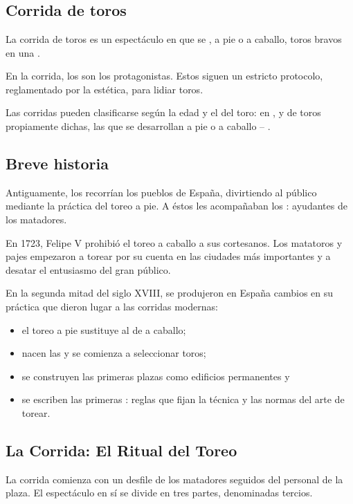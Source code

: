 \chapter*{\docTitle}\label{sec:report}


\section*{Corrida de toros}
%
La corrida de toros es un espectáculo en que se , a pie o a caballo, toros bravos en una .

En la corrida, los  son los protagonistas. Estos siguen un estricto protocolo, reglamentado por la estética, para lidiar toros. 

Las corridas pueden clasificarse según la edad y el  del toro: en ,  y  de toros propiamente dichas, las que se desarrollan a pie o a caballo -- .


\section*{Breve historia}
%
Antiguamente, los  recorrían los pueblos de España, divirtiendo al público mediante la práctica del toreo a pie. A éstos les acompañaban los : ayudantes de los matadores. 

En 1723, Felipe V prohibió el toreo a caballo a sus cortesanos. Los matatoros y pajes empezaron a torear por su cuenta en las ciudades más importantes y a desatar el entusiasmo del gran público.

En la segunda mitad del siglo XVIII, se produjeron en España cambios en su práctica que dieron lugar a las corridas modernas:
%
\begin{itemize}
%
\item el toreo a pie sustituye al de a caballo;
%
\item nacen las  y se comienza a seleccionar toros;
%
\item se construyen las primeras plazas como edificios permanentes y
%
\item se escriben las primeras : reglas que fijan la técnica y las normas del arte de torear.
%
\end{itemize}


\section*{La Corrida: El Ritual del Toreo}
%
La corrida comienza con un desfile de los matadores seguidos del personal de la plaza. El espectáculo en sí se divide en tres partes, denominadas tercios.


